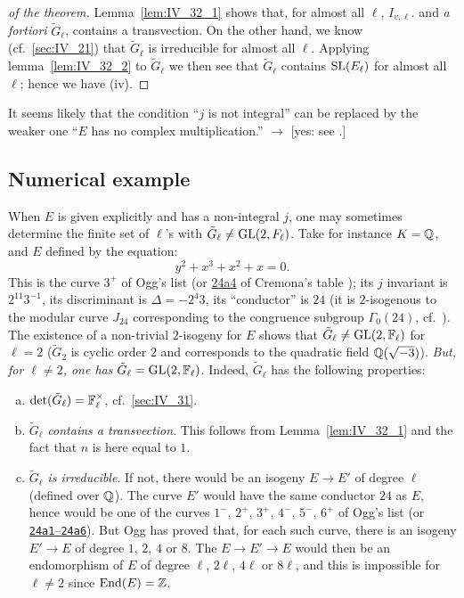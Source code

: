 \begin{proof}[ of the theorem]
	Lemma~\ref{lem:IV_32_1} shows that, for almost all $\ell$, $I_{v,
	\ell}$.  and \emph{a fortiori} $\widetilde{G}_\ell$, contains a
	transvection. On the other hand, we know (cf.\ \ref{sec:IV_21}) that
	$\widetilde{G}_\ell$ is irreducible for almost all $\ell$. Applying
	lemma~\ref{lem:IV_32_2} to $\widetilde{G}_\ell$ we then see that
	$\widetilde{G}_\ell$ contains $\operatorname{SL}({E}_{\ell})$ for almost all
	$\ell$; hence we have (iv).
\end{proof}

\begin{obs}
	It seems likely that the condition ``$j$ is not integral'' can be
	replaced by the weaker one ``$E$ has no complex multiplication.''
	$\to$ [yes: see \cite{76}.]
\end{obs}

\subsection{Numerical example}
\label{sec:IV_33}

When $E$ is given explicitly and has a non-integral $j$, one may sometimes
determine the finite set of $\ell$'s with $\tilde{G}_\ell \neq \operatorname{GL}(2, F_\ell)$.
Take for instance $K = \mathbb{Q}$, and $E$ defined by the equation:
\[
	y^2 + x^3 + x^2 + x = 0.
\]
This is the curve $3^+$ of Ogg's list \cite{20} (or
\href{https://www.lmfdb.org/EllipticCurve/Q/24/a/4}{\ttfamily 24a4} of
Cremona's table \cite{cremona});
%
its $j$ invariant is $2^11 3^{-1}$, 
\dpage
its discriminant is $ \Delta = -2^4 3$, its ``conductor'' is $24$ (it is
$2$-isogenous to the modular curve $J_{24}$ corresponding to the congruence
subgroup $\Gamma_0(24)$, cf.\ \cite{20}). The existence of a non-trivial
$2$-isogeny for $E$ shows that $\tilde{G}_\ell \neq \operatorname{GL}(2, \mathbb{F}_\ell)$ for $\ell =
2$ ($\tilde{G}_2$ is cyclic order $2$ and corresponds to the quadratic field
$\mathbb{Q}(\sqrt{-3})$). \emph{But, for $\ell \neq 2$, one has $\tilde{G}_\ell =
\operatorname{GL}(2,\mathbb{F}_\ell)$}. Indeed, $\tilde{G}_\ell$ has the following properties:
\begin{enumerate}[(a)]
	\item $\det(\tilde{G}_\ell) = \mathbb{F}^\times_\ell$, cf.\ \ref{sec:IV_31}.
	\item $\tilde{G}_\ell$ \emph{contains a transvection}. This follows from
Lemma~\ref{lem:IV_32_1} and the fact that $n$ is here equal to $1$.
	 \item $\tilde{G}_\ell$ \emph{is irreducible}. If not, there would be an
isogeny $E \to E'$ of degree $\ell$ (defined over $\mathbb{Q}$).
The curve $E'$ would have the same conductor $24$ as $E$, hence would be one of
the curves $1^-$, $2^+$, $3^+$, $4^-$, $5^-$, $6^+$ of Ogg's list (or 
\href{https://www.lmfdb.org/EllipticCurve/Q/24/a/}{\texttt{24a1}--\texttt{24a6}}).
But Ogg has proved that, for each such curve, there is an isogeny $E' \to E$ of
degree $1$, $2$, $4$ or $8$.
The $E \to E' \to E$ would then be an endomorphism of $E$ of degree $\ell$,
$2\ell$, $4\ell$ or $8\ell$, and this is impossible for $\ell \neq 2$ since
$\operatorname{End}(E) = \mathbb{Z}$.
\end{enumerate}

